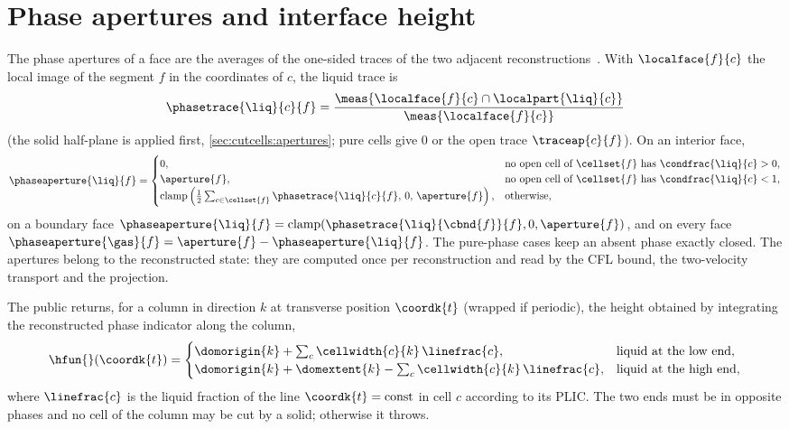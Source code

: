 \section{Phase apertures and interface height}\label{sec:interface:apertures}
The phase apertures of a face are the averages of the one-sided traces of the
two adjacent reconstructions~. With $\localface{f}{c}$ the
local image of the segment $f$ in the coordinates of $c$, the liquid trace is
\begin{equation}\label{eq:interface:liquid-trace}
  \phasetrace{\liq}{c}{f}=\frac{\meas{\localface{f}{c}\cap\localpart{\liq}{c}}}{\meas{\localface{f}{c}}}
\end{equation}
(the solid half-plane is applied first, \cref{sec:cutcells:apertures}; pure
cells give $0$ or the open trace $\traceap{c}{f}$). On an interior face,
\begin{equation}\label{eq:interface:phase-aperture}
  \phaseaperture{\liq}{f}=\begin{cases}
    0, & \text{no open cell of }\cellset{f}\text{ has }\condfrac{\liq}{c}>0,\\
    \aperture{f}, & \text{no open cell of }\cellset{f}\text{ has }\condfrac{\liq}{c}<1,\\
    \operatorname{clamp}\roundpar{\half\sum_{c\in\cellset{f}}\phasetrace{\liq}{c}{f},\,0,\,\aperture{f}}, & \text{otherwise},
  \end{cases}
\end{equation}
on a boundary face $\phaseaperture{\liq}{f}=\operatorname{clamp}(\phasetrace{\liq}{\cbnd{f}}{f},0,\aperture{f})$,
and on every face $\phaseaperture{\gas}{f}=\aperture{f}-\phaseaperture{\liq}{f}$.
The pure-phase cases keep an absent phase exactly closed. The apertures belong
to the reconstructed state: they are computed once per reconstruction and read
by the CFL bound, the two-velocity transport and the projection.

The public  returns, for a column in direction $k$ at
transverse position $\coordk{t}$ (wrapped if periodic), the height obtained by
integrating the reconstructed phase indicator along the column,
\begin{equation}\label{eq:interface:height-api}
  \hfun{}(\coordk{t})=\begin{cases}
    \domorigin{k}+\sum_{c}\cellwidth{c}{k}\,\linefrac{c}, & \text{liquid at the low end},\\
    \domorigin{k}+\domextent{k}-\sum_{c}\cellwidth{c}{k}\,\linefrac{c}, & \text{liquid at the high end},
  \end{cases}
\end{equation}
where $\linefrac{c}$ is the liquid fraction of the line $\coordk{t}=\text{const}$
in cell $c$ according to its PLIC. The two ends must be in opposite phases and
no cell of the column may be cut by a solid; otherwise it throws.

